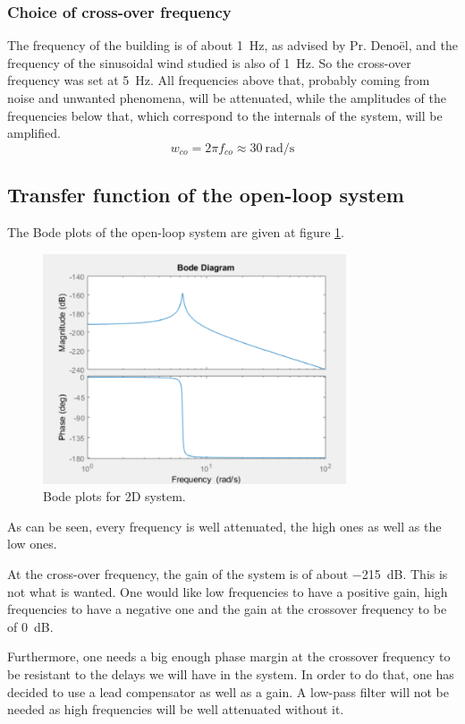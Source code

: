 \subsubsection{Choice of cross-over frequency}
The frequency of the building is of about \SI{1}{\hertz}, as advised by Pr. Denoël, and the frequency of the sinusoidal wind studied is also of \SI{1}{\hertz}. So the cross-over frequency was set at \SI{5}{\hertz}. All frequencies above that, probably coming from noise and unwanted phenomena, will be attenuated, while the amplitudes of the frequencies below that, which correspond to the internals of the system, will be amplified.
$$
w_{co} = 2\pi f_{co} \approx \SI{30}{\radian\per\second}
$$

\subsection{Transfer function of the open-loop system}
The Bode plots of the open-loop system are given at figure \ref{fig:bode-ol}.
\begin{figure}[H]
    \centering
    \includegraphics[width=0.8\textwidth]{resources/png/bode-ol.png}
    \caption{Bode plots for 2D system.}
    \label{fig:bode-ol}
\end{figure}
As can be seen, every frequency is well attenuated, the high ones as well as the low ones.\par
At the cross-over frequency, the gain of the system is of about \SI{-215}{\deci\bel}. This is not what is wanted. One would like low frequencies to have a positive gain, high frequencies to have a negative one and the gain at the crossover frequency to be of \SI{0}{\deci\bel}.\par
Furthermore, one needs a big enough phase margin at the crossover frequency to be resistant to the delays we will have in the system. In order to do that, one has decided to use a lead compensator as well as a gain. A low-pass filter will not be needed as high frequencies will be well attenuated without it.

